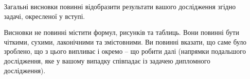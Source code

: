 Загальні висновки повинні відобразити результати вашого дослідження згідно 
задачі, окресленої у вступі.

Висновки не повинні містити формул, рисунків та таблиць. Вони повинні бути 
чіткими, сухими, лаконічними та змістовними. Ви повинні вказати, що саме 
було зроблено, що з цього випливає і окремо -- що робити далі (напрямки 
подальшого дослідження, яке у вашому випадку співпадає із задачею 
дипломного дослідження).